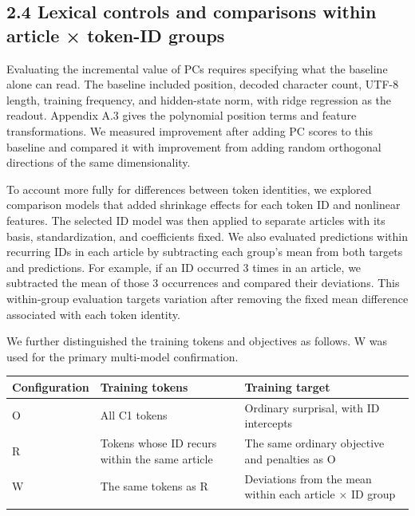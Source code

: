 \FloatBarrier

\subsection{2.4 Lexical controls and comparisons within article × token-ID groups}\label{lexical-controls-and-comparisons-within-article-token-id-groups}

Evaluating the incremental value of PCs requires specifying what the baseline alone can read. The baseline included position, decoded character count, UTF-8 length, training frequency, and hidden-state norm, with ridge regression as the readout. Appendix A.3 gives the polynomial position terms and feature transformations. We measured improvement after adding PC scores to this baseline and compared it with improvement from adding random orthogonal directions of the same dimensionality.

To account more fully for differences between token identities, we explored comparison models that added shrinkage effects for each token ID and nonlinear features. The selected ID model was then applied to separate articles with its basis, standardization, and coefficients fixed. We also evaluated predictions within recurring IDs in each article by subtracting each group's mean from both targets and predictions. For example, if an ID occurred 3 times in an article, we subtracted the mean of those 3 occurrences and compared their deviations. This within-group evaluation targets variation after removing the fixed mean difference associated with each token identity.

We further distinguished the training tokens and objectives as follows. W was used for the primary multi-model confirmation.

\begingroup
\fontsize{9.3}{12}\selectfont\setlength{\tabcolsep}{3.3pt}
{
\begin{longtable}[]{@{}
  >{\raggedright\arraybackslash}p{}
  >{\raggedright\arraybackslash}p{}
  >{\raggedright\arraybackslash}p{}@{}}
\toprule\noalign{}
\begin{minipage}[b]{\linewidth}\raggedright
Configuration
\end{minipage} & \begin{minipage}[b]{\linewidth}\raggedright
Training tokens
\end{minipage} & \begin{minipage}[b]{\linewidth}\raggedright
Training target
\end{minipage} \\
\midrule\noalign{}
\endhead
\bottomrule\noalign{}
\endlastfoot
O & All C1 tokens & Ordinary surprisal, with ID intercepts \\*
R & Tokens whose ID recurs within the same article & The same ordinary objective and penalties as O \\*
W & The same tokens as R & Deviations from the mean within each article × ID group \\*
\end{longtable}
}
\endgroup

